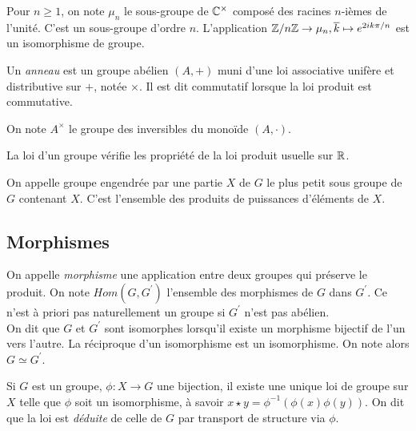 \documentclass{cours}
\begin{document}
\begin{example}
    Pour $n \geq 1$, on note $\mu_{n}$ le sous-groupe de $\mathbb{C}^{\times}$ composé des racines $n$-ièmes de l'unité. C'est un sous-groupe d'ordre $n$. L'application $\mathbb{Z}/n\mathbb{Z} \rightarrow \mu_{n}, \overline{k} \mapsto e^{2ik\pi/n}$ est un isomorphisme de groupe.
\end{example}

\begin{definition}
    Un \emph{anneau} est un groupe abélien $(A, +)$ muni d'une loi associative unifère et distributive sur $+$, notée $\times$. Il est dit commutatif lorsque la loi produit est commutative.
\end{definition}

\begin{definition}
    On note $A^{\times}$ le groupe des inversibles du monoïde $(A, \cdot)$.
\end{definition}

\begin{proposition}
    La loi d'un groupe vérifie les propriété de la loi produit usuelle sur $\mathbb{R}$.
\end{proposition}

\begin{definition}
    On appelle groupe engendrée par une partie $X$ de $G$ le plus petit sous groupe de $G$ contenant $X$. C'est l'ensemble des produits de puissances d'éléments de $X$.
\end{definition}

\subsection{Morphismes}
\begin{definition}
    On appelle \emph{morphisme} une application entre deux groupes qui préserve le produit. On note $Hom(G, G^{'})$ l'ensemble des morphismes de $G$ dans $G^{'}$. Ce n'est à priori pas naturellement un groupe si $G^{'}$ n'est pas abélien.  \\
    On dit que $G$ et $G^{'}$ sont isomorphes lorsqu'il existe un morphisme bijectif de l'un vers l'autre. La réciproque d'un isomorphisme est un isomorphisme. On note alors $G \simeq G^{'}$.
\end{definition}

\begin{proposition}\label{transport}
    Si $G$ est un groupe, $\phi : X \rightarrow G$ une bijection, il existe une unique loi de groupe sur $X$ telle que $\phi$ soit un isomorphisme, à savoir $x \star y = \phi^{-1}(\phi(x)\phi(y))$. On dit que la loi est \emph{déduite} de celle de $G$ par transport de structure via $\phi$.
\end{proposition}
\end{document}
